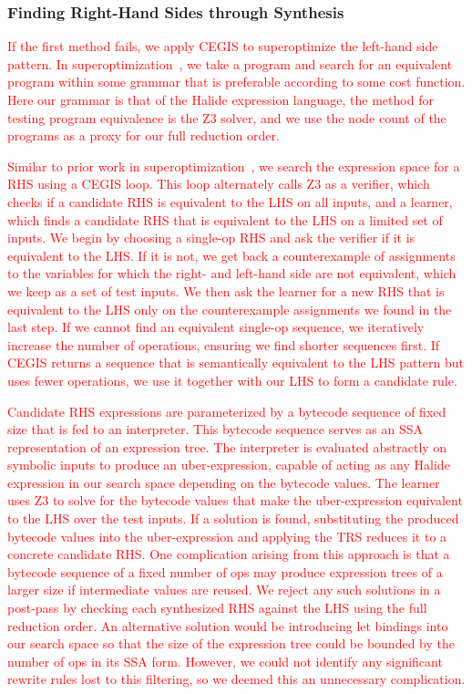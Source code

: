 \documentclass[acmsmall,review]{acmart}\settopmatter{printfolios=true,printccs=false,printacmref=false}
\newcommand{\modified}[1]{\textcolor{red}{{#1}}}
\begin{document}
\subsubsection{Finding Right-Hand Sides through Synthesis}
\label{sec:rhssynthesis}
\modified{If the first method fails, we apply CEGIS to superoptimize the left-hand side pattern.
In superoptimization~\cite{massalin1987superoptimizer}, we take a program and search 
for an equivalent program within some grammar that is preferable according 
to some cost function. Here our grammar is that of the Halide expression language, 
the method for testing program equivalence is the Z3 solver, and we use the node
count of the programs as a proxy for our full reduction order.}

\modified{Similar to prior work in superoptimization~\cite{regehr2018superoptimization, mangpo2016superoptimization},
we search the expression space for a RHS using a CEGIS loop. This loop alternately calls Z3 as a
verifier, which checks if a candidate RHS is equivalent to the LHS on all inputs, 
and a learner, which finds a candidate RHS that is equivalent to the LHS on
a limited set of inputs.
We begin by choosing a single-op
RHS and ask the verifier if it is equivalent to the LHS. If it is not, we get back 
a counterexample of assignments to the variables for which the right- and left-hand side are 
not equivalent, which we keep as a set of test inputs. 
We then ask the learner for a new RHS that is equivalent to the LHS 
only on the counterexample assignments we found in the last step. 
If we cannot find an equivalent single-op sequence,
we iteratively increase the number of operations, ensuring we find shorter sequences
first.  If CEGIS returns a sequence that is semantically equivalent to the LHS pattern but uses fewer
operations, we use it together with our LHS to form a candidate rule.}

\modified{ Candidate RHS expressions are parameterized by a bytecode
  sequence of fixed size that is fed to an interpreter. This bytecode
  sequence serves as an SSA representation of an expression tree. The
  interpreter is evaluated abstractly on symbolic inputs to produce an
  uber-expression, capable of acting as any Halide expression in our
  search space depending on the bytecode values. The learner uses Z3
  to solve for the bytecode values that make the uber-expression
  equivalent to the LHS over the test inputs. If a solution is found,
  substituting the produced bytecode values into the uber-expression
  and applying the TRS reduces it to a concrete candidate RHS. One
  complication arising from this approach is that a bytecode sequence
  of a fixed number of ops may produce expression trees of a larger
  size if intermediate values are reused. We reject any such solutions
  in a post-pass by checking each synthesized RHS against the LHS
  using the full reduction order. An alternative solution would be
  introducing let bindings into our search space so that the size of
  the expression tree could be bounded by the number of ops in its SSA
  form. However, we could not identify any significant rewrite rules
  lost to this filtering, so we deemed this an unnecessary
  complication. }
\end{document}
